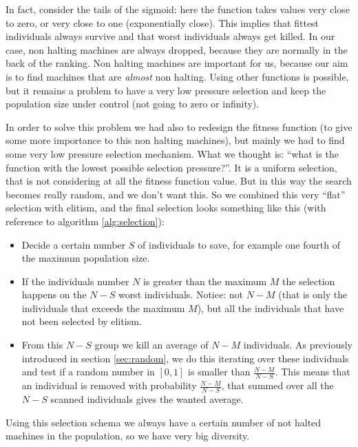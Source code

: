 \documentclass{report}
\begin{document}
In fact, consider the tails of the sigmoid: here the function takes values very close to zero, or very close to one (exponentially close). This implies that fittest individuals always survive and that worst individuals always get killed. In our case, non halting machines are always dropped, because they are normally in the back of the ranking. Non halting machines are important for us, because our aim is to find machines that are \textit{almost} non halting.
Using other functions is possible, but it remains a problem to have a very low pressure selection and keep the population size under control (not going to zero or infinity).

In order to solve this problem we had also to redesign the fitness function (to give some more importance to this non halting machines), but mainly we had to find some very low pressure selection mechanism.
What we thought is: ``what is the function with the lowest possible selection pressure?''. It is a uniform selection, that is not considering at all the fitness function value. But in this way the search becomes really random, and we don't want this. So we combined this very ``flat'' selection with elitism, and the final selection looks something like this (with reference to algorithm \ref{alg:selection}):

\begin{itemize}
\item Decide a certain number $S$ of individuals to save, for example one fourth of the maximum population size.
\item If the individuals number $N$ is greater than the maximum $M$ the selection happens on the $N-S$ worst individuals. Notice: not $N-M$ (that is only the individuals that exceeds the maximum $M$), but all the individuals that have not been selected by elitism.
\item From this $N-S$ group we kill an average of $N-M$ individuals. As previously introduced in section
\ref{sec:random}, we do this iterating over these individuals and test if a random number in $[0,1]$ is smaller than $\frac{N-M}{N-S}$. This means that an individual is removed with probability $\frac{N-M}{N-S}$, that summed over all the $N-S$ scanned individuals gives the wanted average.
\end{itemize}

Using this selection schema we always have a certain number of not halted machines in the population, so we have very big diversity.
\end{document}
